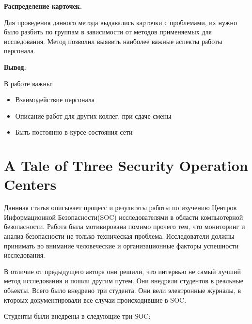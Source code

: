 \documentclass[11pt, a4paper]{article}		%
\begin{document}
{\bf Распределение карточек. }

Для проведения данного метода выдавались карточки с проблемами, их нужно было разбить по группам в зависимости от методов применяемых для исследования. Метод позволил выявить наиболее важные аспекты работы персонала.

{\bf Вывод. }

В работе важны:

\begin{itemize}

\item Взаимодействие персонала

\item Описание работ для других коллег, при сдаче смены

\item Быть постоянно в курсе состояния сети

\end{itemize}


\section{A Tale of Three Security Operation Centers}

Даннная статья описывает процесс и результаты работы по изучению Центров Информационной Безопасности(SOC) исследователями в области компьютерной безопасности. Работа была мотивирована помимо прочего тем, что мониторинг и анализ безопасности не только техническая проблема. Исследователи должны принимать во внимание человеческие и организационные факторы успешности исследования.

В отличие от предыдущего автора они решили, что интервью не самый лучший метод исследования и пошли другим путем. Они внедряли студентов в реальные объекты. Всего было внедрено три студента. Они вели электронные журналы, в ктороых документировали все случаи происходившие в SOC.

Студенты были внедрены в следующие три SOC:
\end{document}
